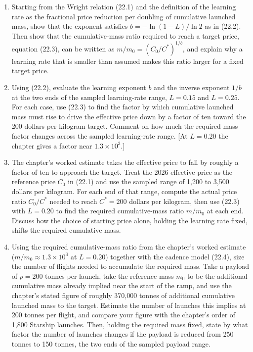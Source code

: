 \documentclass[
  11pt,
  openany,
  oneside]{book}
\begin{document}
\begin{enumerate}
\def\labelenumi{\arabic{enumi}.}
\item
  Starting from the Wright relation (22.1) and the definition of the
  learning rate as the fractional price reduction per doubling of
  cumulative launched mass, show that the exponent satisfies
  \(b = -\ln(1-L)/\ln 2\) as in (22.2). Then show that the
  cumulative-mass ratio required to reach a target price, equation
  (22.3), can be written as \(m/m_0 = (C_0/C^\ast)^{1/b}\), and explain
  why a learning rate that is smaller than assumed makes this ratio
  larger for a fixed target price.
\item
  Using (22.2), evaluate the learning exponent \(b\) and the inverse
  exponent \(1/b\) at the two ends of the sampled learning-rate range,
  \(L = 0.15\) and \(L = 0.25\). For each case, use (22.3) to find the
  factor by which cumulative launched mass must rise to drive the
  effective price down by a factor of ten toward the 200 dollars per
  kilogram target. Comment on how much the required mass factor changes
  across the sampled learning-rate range. {[}At \(L=0.20\) the chapter
  gives a factor near \(1.3\times 10^3\).{]}
\item
  The chapter's worked estimate takes the effective price to fall by
  roughly a factor of ten to approach the target. Treat the 2026
  effective price as the reference price \(C_0\) in (22.1) and use the
  sampled range of 1,200 to 3,500 dollars per kilogram. For each end of
  that range, compute the actual price ratio \(C_0/C^\ast\) needed to
  reach \(C^\ast = 200\) dollars per kilogram, then use (22.3) with
  \(L = 0.20\) to find the required cumulative-mass ratio \(m/m_0\) at
  each end. Discuss how the choice of starting price alone, holding the
  learning rate fixed, shifts the required cumulative mass.
\item
  Using the required cumulative-mass ratio from the chapter's worked
  estimate (\(m/m_0 \approx 1.3\times 10^3\) at \(L = 0.20\)) together
  with the cadence model (22.4), size the number of flights needed to
  accumulate the required mass. Take a payload of \(p = 200\) tonnes per
  launch, take the reference mass \(m_0\) to be the additional
  cumulative mass already implied near the start of the ramp, and use
  the chapter's stated figure of roughly 370,000 tonnes of additional
  cumulative launched mass to the target. Estimate the number of
  launches this implies at 200 tonnes per flight, and compare your
  figure with the chapter's order of 1,800 Starship launches. Then,
  holding the required mass fixed, state by what factor the number of
  launches changes if the payload is reduced from 250 tonnes to 150
  tonnes, the two ends of the sampled payload range.
\end{enumerate}
\end{document}

